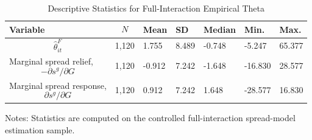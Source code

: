 \begin{table}[H]\centering
\begin{threeparttable}
\caption{Descriptive Statistics for Full-Interaction Empirical Theta}
\label{tab:theta_descriptive_stats}
\scriptsize
\begin{tabularx}{\textwidth}{lYYYYYY}
\toprule
Variable & $$N$$ & Mean & SD & Median & Min. & Max. \\
\midrule
$$\widehat{\theta}^{F}_{it}$$ & 1,120 & 1.755 & 8.489 & -0.748 & -5.247 & 65.377 \\
Marginal spread relief, $$-\partial s^g/\partial G$$ & 1,120 & -0.912 & 7.242 & -1.648 & -16.830 & 28.577 \\
Marginal spread response, $$\partial s^g/\partial G$$ & 1,120 & 0.912 & 7.242 & 1.648 & -28.577 & 16.830 \\
\bottomrule
\end{tabularx}
\begin{tablenotes}[flushleft]\footnotesize
\item Notes: Statistics are computed on the controlled full-interaction spread-model estimation sample.
\end{tablenotes}
\end{threeparttable}
\end{table}

